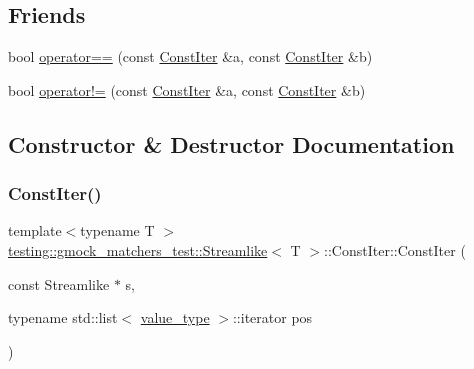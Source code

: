 \subsection*{Friends}
\begin{DoxyCompactItemize}
\item 
bool \mbox{\hyperlink{classtesting_1_1gmock__matchers__test_1_1_streamlike_1_1_const_iter_a901fdc0cf03a573177b1e1c23925043d}{operator==}} (const \mbox{\hyperlink{classtesting_1_1gmock__matchers__test_1_1_streamlike_1_1_const_iter}{Const\+Iter}} \&a, const \mbox{\hyperlink{classtesting_1_1gmock__matchers__test_1_1_streamlike_1_1_const_iter}{Const\+Iter}} \&b)
\item 
bool \mbox{\hyperlink{classtesting_1_1gmock__matchers__test_1_1_streamlike_1_1_const_iter_abed2e0628cac1a6c253ab60f9ad743f6}{operator!=}} (const \mbox{\hyperlink{classtesting_1_1gmock__matchers__test_1_1_streamlike_1_1_const_iter}{Const\+Iter}} \&a, const \mbox{\hyperlink{classtesting_1_1gmock__matchers__test_1_1_streamlike_1_1_const_iter}{Const\+Iter}} \&b)
\end{DoxyCompactItemize}


\subsection{Constructor \& Destructor Documentation}
\mbox{\label{classtesting_1_1gmock__matchers__test_1_1_streamlike_1_1_const_iter_ad986f4c477f42fe95dba4aedac08bcda}} 
\subsubsection{\texorpdfstring{ConstIter()}{ConstIter()}}
{\footnotesize\ttfamily template$<$typename T $>$ \\
\mbox{\hyperlink{classtesting_1_1gmock__matchers__test_1_1_streamlike}{testing\+::gmock\+\_\+matchers\+\_\+test\+::\+Streamlike}}$<$ T $>$\+::Const\+Iter\+::\+Const\+Iter (\begin{DoxyParamCaption}\item[{const Streamlike $\ast$}]{s,  }\item[{typename std\+::list$<$ \mbox{\hyperlink{classtesting_1_1gmock__matchers__test_1_1_streamlike_a7e2c2e021676c1ed5dea63cdd019661c}{value\+\_\+type}} $>$\+::iterator}]{pos }\end{DoxyParamCaption})\hspace{0.3cm}{\ttfamily [inline]}}




